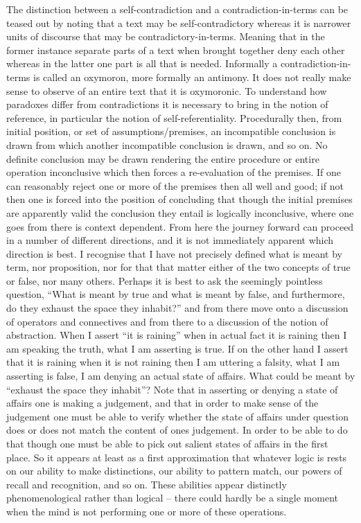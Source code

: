 \documentclass[dah,phd,a4paper]{xe_uccthesis}
\begin{document}
The distinction between a self-contradiction and a contradiction-in-terms can be teased out by noting that a text may be self-contradictory whereas it is narrower units of discourse that may be contradictory-in-terms. Meaning that in the former instance separate parts of a text when brought together deny each other whereas in the latter one part is all that is needed. Informally a contradiction-in-terms is called an oxymoron, more formally an antimony. It does not really make sense to observe of an entire text that it is oxymoronic. To understand how paradoxes differ from contradictions it is necessary to bring in the notion of reference, in particular the notion of self-referentiality. Procedurally then, from initial position, or set of assumptions/premises, an incompatible conclusion is drawn from which another incompatible conclusion is drawn, and so on. No definite conclusion may be drawn rendering the entire procedure or entire operation inconclusive which then forces a re-evaluation of the premises. If one can reasonably reject one or more of the premises then all well and good; if not then one is forced into the position of concluding that though the initial premises are apparently valid the conclusion they entail is logically inconclusive, where one goes from there is context dependent.
From here the journey forward can proceed in a number of different directions, and it is not immediately apparent which direction is best. I recognise that I have not precisely defined what is meant by term, nor proposition, nor for that that matter either of the two concepts of true or false, nor many others.
Perhaps it is best to ask the seemingly pointless question, “What is meant by true and what is meant by false, and furthermore, do they exhaust the space they inhabit?” and from there move onto a discussion of operators and connectives and from there to a discussion of the notion of abstraction.
When I assert “it is raining” when in actual fact it is raining then I am speaking the truth, what I am asserting is true. If on the other hand I assert that it is raining when it is not raining then I am uttering a falsity, what I am asserting is false, I am denying an actual state of affairs. What could be meant by “exhaust the space they inhabit”? Note that in asserting or denying a state of affairs one is making a judgement, and that in order to make sense of the judgement one must be able to verify whether the state of affairs under question does or does not match the content of ones judgement. In order to be able to do that though one must be able to pick out salient states of affairs in the first place. So it appears at least as a first approximation that whatever logic is rests on our ability to make distinctions, our ability to pattern match, our powers of recall and recognition, and so on. These abilities appear distinctly phenomenological rather than logical – there could hardly be a single moment when the mind is not performing one or more of these operations.
\end{document}
